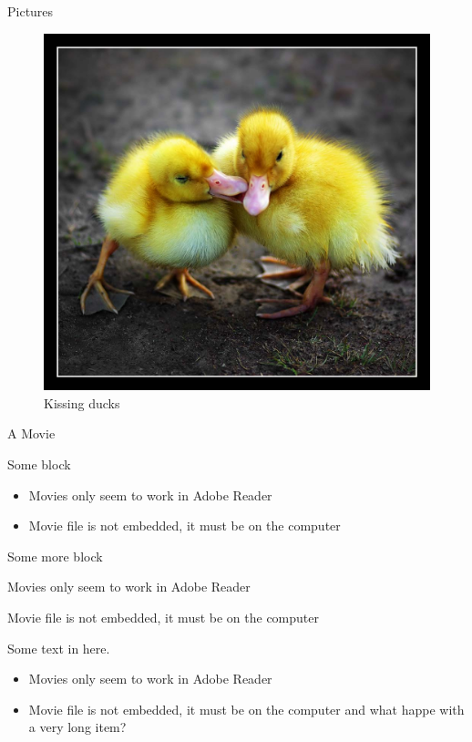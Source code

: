 \documentclass[pdflatex,compress,9pt,
	xcolor={dvipsnames,dvipsnames,svgnames,x11names,table},
	hyperref={colorlinks = true,breaklinks = true, urlcolor = NavyBlue, breaklinks = true}]{beamer}
\begin{document}
\begin{frame}
  {Pictures}

  \begin{figure}[t]
    \centering
    \includegraphics[height=\dimexpr11\textheight/16\relax]{ducks}
    \caption{Kissing ducks}
  \end{figure}
\end{frame}


\begin{frame}
  {A Movie}

  \begin{block}
    {Some block}

    \begin{itemize}
    \item Movies only seem to work in Adobe Reader
    \item Movie file is not embedded, it must be on the computer
    \end{itemize}
  \end{block}

  \pause
  \begin{alertblock}
    {Some more block}

    Movies only seem to work in Adobe Reader\par
    Movie file is not embedded, it must be on the computer
  \end{alertblock}
  \pause

  \begin{exampleblock}{}
    Some text in here.

    \begin{itemize}[<+->]
    \item Movies only seem to work in Adobe Reader
    \item Movie file is not embedded, it must be on the computer and
      what happe with a very long item?
    \end{itemize}
  \end{exampleblock}
\end{frame}
\end{document}
